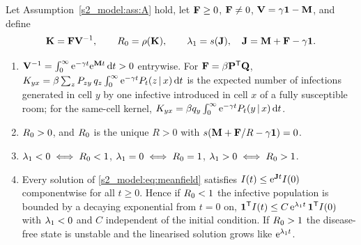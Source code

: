 \begin{theorem}\label{s3_r0:thm:ngm}
  Let Assumption~\ref{s2_model:ass:A} hold, let $\mathbf{F}\ge0$, $\mathbf{F}\neq0$, $\mathbf{V}=\gamma\mathbf{1}-\mathbf{M}$, and define
  \begin{equation}\label{s3_r0:eq:ngm}
     \mathbf{K}=\mathbf{F}\mathbf{V}^{-1},\qquad R_0=\rho(\mathbf{K}),\qquad \lambda_1=s(\mathbf{J}),\quad \mathbf{J}=\mathbf{M}+\mathbf{F}-\gamma\mathbf{1} .
  \end{equation}
  \begin{enumerate}[label=\textup{(\alph*)},leftmargin=*]
    \item $\mathbf{V}^{-1}=\int_0^\infty \mathrm{e}^{-\gamma t}\mathrm{e}^{\mathbf{M} t}\,\mathrm{d} t>0$ entrywise.  For $\mathbf{F}=\beta\mathbf{P}^{\mathsf{T}}\mathbf{Q}$,
      $K_{yx}=\beta\sum_{z}P_{zy}\,q_z\int_0^\infty \mathrm{e}^{-\gamma t}P_t(z\,|\,x)\,\mathrm{d} t$ is the expected number of
      infections generated in cell $y$ by one infective introduced in cell $x$ of a fully susceptible room;
      for the same-cell kernel, $K_{yx}=\beta q_y\int_0^\infty \mathrm{e}^{-\gamma t}P_t(y\,|\,x)\,\mathrm{d} t$.
    \item $R_0>0$, and $R_0$ is the unique $R>0$ with $s(\mathbf{M}+\mathbf{F}/R-\gamma\mathbf{1})=0$.
    \item $\lambda_1<0\iff R_0<1$, $\lambda_1=0\iff R_0=1$, $\lambda_1>0\iff R_0>1$.
    \item Every solution of \eqref{s2_model:eq:meanfield} satisfies $I(t)\le \mathrm{e}^{\mathbf{J} t}I(0)$ componentwise
      for all $t\ge0$.  Hence if $R_0<1$ the infective population is bounded by a decaying exponential from
      $t=0$ on, $\boldsymbol{1}^{\mathsf{T}}I(t)\le C\,\mathrm{e}^{\lambda_1 t}\,\boldsymbol{1}^{\mathsf{T}}I(0)$ with $\lambda_1<0$ and $C$ independent of the
      initial condition.  If $R_0>1$ the disease-free state is unstable and the linearised solution grows like
      $\mathrm{e}^{\lambda_1 t}$.
  \end{enumerate}
\end{theorem}


